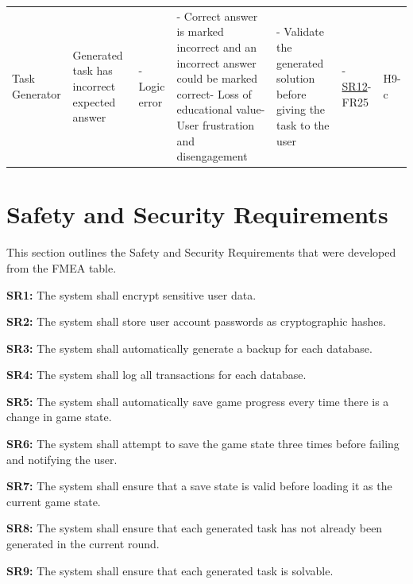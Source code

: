 \documentclass{article}
\begin{document}
\begin{landscape}
\begin{tabularx}{\linewidth}{|P{2.3cm}|Y|Y|Y|Y|P{1.7cm}|P{0.8cm}|}
    \hline

    Task Generator &
    Generated task has incorrect expected answer &
    - Logic error &
    - Correct answer is marked incorrect and an incorrect answer could be marked correct\newline- Loss of educational value\newline- User frustration and disengagement &
    - Validate the generated solution before giving the task to the user &
    - \hyperref[req:SR12]{SR12}\newline- FR25 &
    H9-c \\

\end{tabularx}
\end{landscape}

\section{Safety and Security Requirements}

This section outlines the Safety and Security Requirements that were developed from the FMEA table.\newline

\noindent\textbf{SR1\label{req:SR1}:} The system shall encrypt sensitive user data.

\noindent\textbf{SR2\label{req:SR2}:} The system shall store user account passwords as cryptographic hashes.

\noindent\textbf{SR3\label{req:SR3}:} The system shall automatically generate a backup for each database.

\noindent\textbf{SR4\label{req:SR4}:} The system shall log all transactions for each database.

\noindent\textbf{SR5\label{req:SR5}:} The system shall automatically save game progress every time there is a change in game state.

\noindent\textbf{SR6\label{req:SR6}:} The system shall attempt to save the game state three times before failing and notifying the user.

\noindent\textbf{SR7\label{req:SR7}:} The system shall ensure that a save state is valid before loading it as the current game state.

\noindent\textbf{SR8\label{req:SR8}:} The system shall ensure that each generated task has not already been generated in the current round.

\noindent\textbf{SR9\label{req:SR9}:} The system shall ensure that each generated task is solvable.
\end{document}
